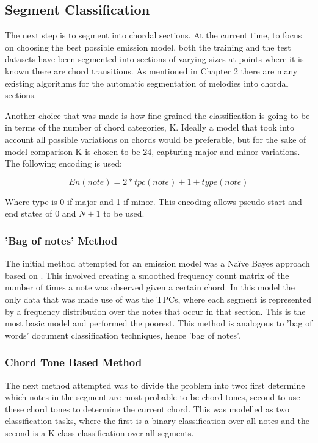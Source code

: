 \documentclass[bsc,singlespacing,parskip,deptreport,twoside,frontabs]{infthesis}
\begin{document}
\subsection{Segment Classification}

The next step is to segment into chordal sections. At the current time, to focus on choosing the best possible emission model, both the training and the test datasets have been segmented into sections of varying sizes at points where it is known there are chord transitions. As mentioned in Chapter 2 there are many existing algorithms for the automatic segmentation of melodies into chordal sections.

Another choice that was made is how fine grained the classification is going to be in terms of the number of chord categories, K. Ideally a model that took into account all possible variations on chords would be preferable, but for the sake of model comparison K is chosen to be 24, capturing major and minor variations. The following encoding is used:

$$
En(note) = 2 * tpc(note) + 1 + type(note)
$$

Where type is 0 if major and 1 if minor. This encoding allows pseudo start and end states of 0 and $N+1$ to be used.

\subsubsection{'Bag of notes' Method}

The initial method attempted for an emission model was a Na\"ive Bayes approach based on \cite{mysong}. This involved creating a smoothed frequency count matrix of the number of times a note was observed given a certain chord. In this model the only data that was made use of was the TPCs, where each segment is represented by a frequency distribution over the notes that occur in that section. This is the most basic model and performed the poorest. This method is analogous to 'bag of words' document classification techniques, hence 'bag of notes'.

\subsubsection{Chord Tone Based Method}

The next method attempted was to divide the problem into two: first determine which notes in the segment are most probable to be chord tones, second to use these chord tones to determine the current chord. This was modelled as two classification tasks, where the first is a binary classification over all notes and the second is a K-class classification over all segments.
\end{document}
